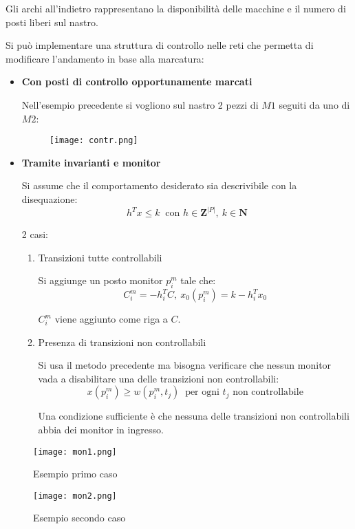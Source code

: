\documentclass{article}
\begin{document}
\noindent Gli archi all'indietro rappresentano la disponibilità delle macchine e il numero di posti liberi sul nastro.\newline

\noindent Si può implementare una struttura di controllo nelle reti che permetta di modificare l'andamento in base alla marcatura:
\begin{itemize}
    \item \textbf{Con posti di controllo opportunamente marcati}

    Nell'esempio precedente si vogliono sul nastro 2 pezzi di $M1$ seguiti da uno di $M2$:
    \begin{figure}[H]
        \centering
        \texttt{[image: contr.png]}
    \end{figure}
    
    \item \textbf{Tramite invarianti e monitor}

        Si assume che il comportamento desiderato sia descrivibile con la disequazione:
        $$h^Tx\leq k\ \text{ con }h\in\mathbf{Z}^{|P|},\ k\in\mathbf{N}$$\newline

        2 casi:
        \begin{enumerate}
            \item Transizioni tutte controllabili

                Si aggiunge un posto monitor $p_i^m$ tale che:
                $$C_i^m=-h_i^TC,\ x_0(p_i^m)=k-h_i^Tx_0$$

                $C_i^m$ viene aggiunto come riga a $C$.
        
            
            \item Presenza di transizioni non controllabili

                Si usa il metodo precedente ma bisogna verificare che nessun monitor vada a disabilitare una delle transizioni non controllabili:
                $$x(p_i^m)\geq w(p_i^m,t_j)\ \text{ per ogni } t_j\text{ non controllabile}$$

                Una condizione sufficiente è che nessuna delle transizioni non controllabili abbia dei monitor in ingresso.
            
        \end{enumerate}
    
\end{itemize}

\begin{figure}[ht]
    \centering
    \texttt{[image: mon1.png]}
    \caption{Esempio primo caso}
\end{figure}

\begin{figure}[ht]
    \centering
    \texttt{[image: mon2.png]}
    \caption{Esempio secondo caso}
\end{figure}
\end{document}
